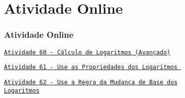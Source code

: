 \section{Atividade Online}
\begin{frame}
\frametitle{Atividade Online} 

\href{https://pt.khanacademy.org/math/algebra2/exponential-and-logarithmic-functions/introduction-to-logarithms/e/logarithms_1.5}
{{\tt Atividade 60 - Cálculo de Logaritmos (Avançado)}}

\href{https://pt.khanacademy.org/math/algebra2/exponential-and-logarithmic-functions/properties-of-logarithms/e/logarithms_2}
{{\tt Atividade 61 - Use as Propriedades dos Logaritmos }}

\href{https://pt.khanacademy.org/math/algebra2/exponential-and-logarithmic-functions/change-of-base-formula-for-logarithms/e/rewrite-logarithmic-expressions-using-the-change-of-base-rule}
{{\tt Atividade 62 - Use a Regra da Mudança de Base dos\\ Logaritmos}}



\end{frame}